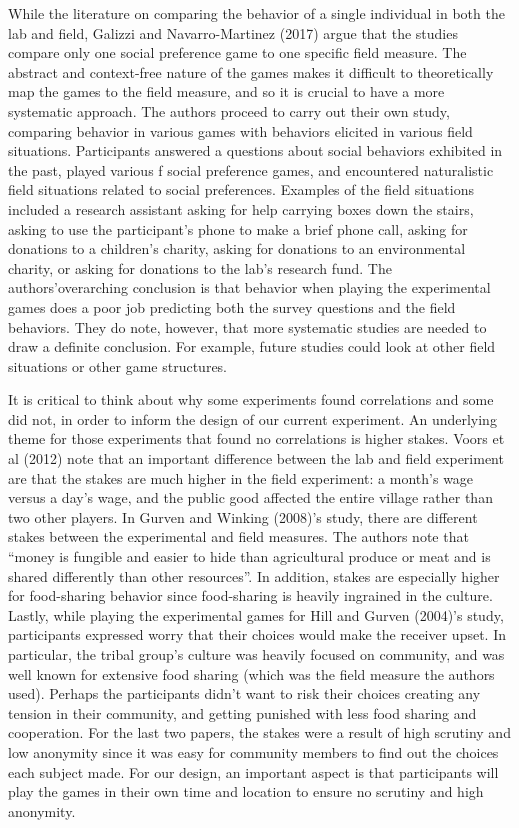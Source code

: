 \documentclass{article}
\begin{document}
 
While the literature on comparing the behavior of a single individual in both the lab and field, Galizzi and Navarro-Martinez (2017) argue that the studies compare only one social preference game to one specific field measure. The abstract and context-free nature of the games makes it difficult to theoretically map the games to the field measure, and so it is crucial to have a more systematic approach. The authors proceed to carry out their own study, comparing behavior in various games with behaviors elicited in various field situations. Participants answered a questions about social behaviors exhibited in the past, played various f social preference games, and encountered naturalistic field situations related to social preferences. Examples of the field situations included a research assistant asking for help carrying boxes down the stairs, asking to use the participant\rq s phone to make a brief phone call, asking for donations to a children\rq s charity, asking for donations to an environmental charity, or asking for donations to the lab\rq s research fund. The authors\rq  overarching conclusion is that behavior when playing the experimental games does a poor job predicting both the survey questions and the field behaviors. They do note, however, that more systematic studies are needed to draw a definite conclusion. For example, future studies could look at other field situations or other game structures. 

It is critical to think about why some experiments found correlations and some did not, in order to inform the design of our current experiment. An underlying theme for those experiments that found no correlations is higher stakes. Voors et al (2012) note that an important difference between the lab and field experiment are that the stakes are much higher in the field experiment: a month\rq s wage versus a day\rq s wage, and the public good affected the entire village rather than two other players. In Gurven and Winking (2008)\rq s study, there are different stakes between the experimental and field measures. The authors note that ``money is fungible and easier to hide than agricultural produce or meat and is shared differently than other resources''. In addition, stakes are especially higher for food-sharing behavior since food-sharing is heavily ingrained in the culture. Lastly, while playing the experimental games for Hill and Gurven (2004)\rq s study, participants expressed worry that their choices would make the receiver upset. In particular, the tribal group\rq s culture was heavily focused on community, and was well known for extensive food sharing (which was the field measure the authors used). Perhaps the participants didn\rq t want to risk their choices creating any tension in their community, and getting punished with less food sharing and cooperation. For the last two papers, the stakes were a result of high scrutiny and low anonymity since it was easy for community members to find out the choices each subject made. For our design, an important aspect is that participants will play the games in their own time and location to ensure no scrutiny and high anonymity. 
\end{document}
